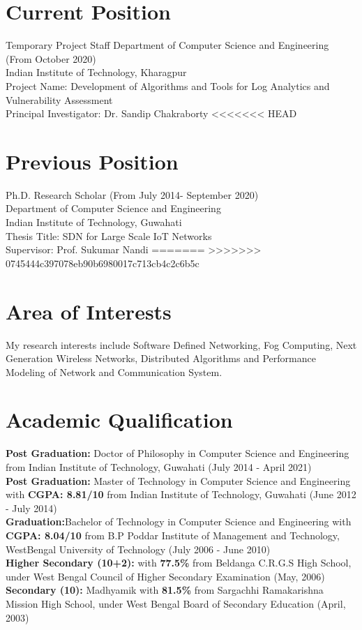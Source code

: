 \documentclass{article}
\begin{document}
\section{Current Position}          
Temporary 	Project Staff
Department of Computer Science and Engineering (From October 2020)\\
Indian Institute of Technology, Kharagpur\\
Project Name: Development of Algorithms and Tools for Log Analytics  and Vulnerability Assessment \\
Principal Investigator: Dr. Sandip Chakraborty
<<<<<<< HEAD
\section{Previous Position}
	Ph.D. Research Scholar  (From July 2014- September 2020)\\
    Department of Computer Science and Engineering\\
    Indian Institute of Technology, Guwahati\\
    Thesis Title: SDN for Large Scale IoT Networks\\
    Supervisor: Prof. Sukumar Nandi
=======
>>>>>>> 0745444c397078eb90b6980017c713cb4c2c6b5c
\section{Area of Interests}    
 		My research interests include Software Defined Networking, Fog Computing, Next Generation Wireless Networks, Distributed Algorithms and Performance Modeling of Network and Communication System.
\section{Academic Qualification} 
	{\bf Post Graduation:} Doctor of Philosophy in Computer Science and Engineering from Indian Institute of Technology, Guwahati (July 2014 - April 2021)\\[3ex]
	{\bf Post Graduation:} Master of Technology in Computer Science and Engineering with {\bf CGPA: 8.81/10} from Indian Institute of Technology, Guwahati (June 2012 - July 2014)\\[3ex]
	{\bf Graduation:}Bachelor of Technology in Computer Science and Engineering with {\bf CGPA: 8.04/10} from B.P Poddar Institute of Management and Technology, WestBengal University of Technology (July 2006 - June 2010)\\[3ex]
	{\bf Higher Secondary (10+2):} with {\bf 77.5\%} from Beldanga C.R.G.S High School, under West Bengal Council of Higher Secondary Examination (May, 2006)\\[3ex]
	{\bf Secondary (10):} Madhyamik with {\bf 81.5\%} from Sargachhi Ramakarishna Mission High School, under West Bengal Board of Secondary Education (April, 2003)
\end{document}

